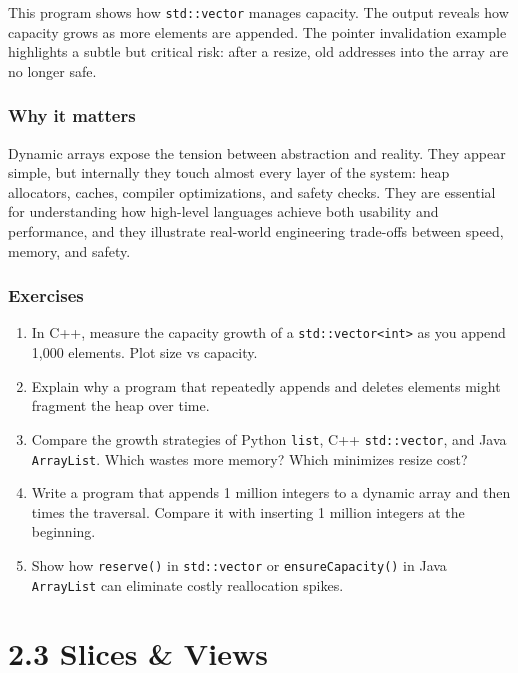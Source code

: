\documentclass[
  letterpaper,
  DIV=11,
  numbers=noendperiod]{scrreprt}
\providecommand{\tightlist}{%
  \setlength{\itemsep}{0pt}\setlength{\parskip}{0pt}}
\begin{document}
This program shows how \texttt{std::vector} manages capacity. The output
reveals how capacity grows as more elements are appended. The pointer
invalidation example highlights a subtle but critical risk: after a
resize, old addresses into the array are no longer safe.

\subsubsection{Why it matters}\label{why-it-matters-17}

Dynamic arrays expose the tension between abstraction and reality. They
appear simple, but internally they touch almost every layer of the
system: heap allocators, caches, compiler optimizations, and safety
checks. They are essential for understanding how high-level languages
achieve both usability and performance, and they illustrate real-world
engineering trade-offs between speed, memory, and safety.

\subsubsection{Exercises}\label{exercises-17}

\begin{enumerate}
\def\labelenumi{\arabic{enumi}.}
\tightlist
\item
  In C++, measure the capacity growth of a
  \texttt{std::vector\textless{}int\textgreater{}} as you append 1,000
  elements. Plot size vs capacity.
\item
  Explain why a program that repeatedly appends and deletes elements
  might fragment the heap over time.
\item
  Compare the growth strategies of Python \texttt{list}, C++
  \texttt{std::vector}, and Java \texttt{ArrayList}. Which wastes more
  memory? Which minimizes resize cost?
\item
  Write a program that appends 1 million integers to a dynamic array and
  then times the traversal. Compare it with inserting 1 million integers
  at the beginning.
\item
  Show how \texttt{reserve()} in \texttt{std::vector} or
  \texttt{ensureCapacity()} in Java \texttt{ArrayList} can eliminate
  costly reallocation spikes.
\end{enumerate}

\section{2.3 Slices \& Views}\label{slices-views}
\end{document}
